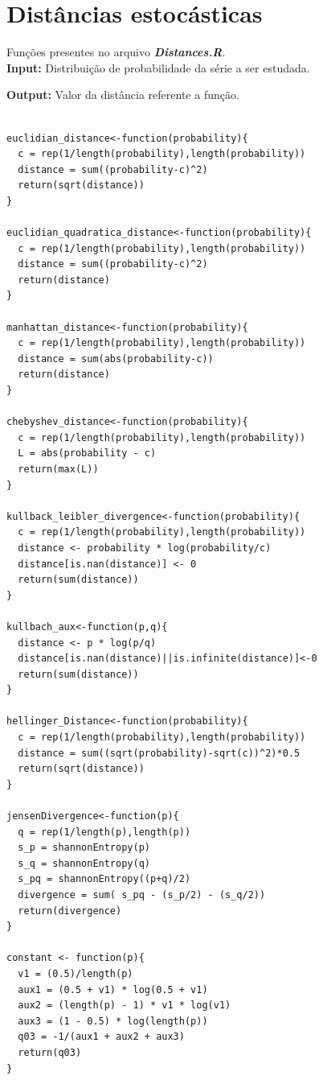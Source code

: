 \documentclass[12pt,letterpaper]{article}
\begin{document}
\section{Distâncias estocásticas}

Funções presentes no arquivo \textbf{\textit{Distances.R}}.\\

\textbf{Input: } Distribuição de probabilidade da série a ser estudada.

\textbf{Output: } Valor da distância referente a função.\\ 

\begin{lstlisting}

euclidian_distance<-function(probability){
  c = rep(1/length(probability),length(probability))
  distance = sum((probability-c)^2)
  return(sqrt(distance))
}

euclidian_quadratica_distance<-function(probability){
  c = rep(1/length(probability),length(probability))
  distance = sum((probability-c)^2)
  return(distance)
}

manhattan_distance<-function(probability){
  c = rep(1/length(probability),length(probability))
  distance = sum(abs(probability-c))
  return(distance)
}

chebyshev_distance<-function(probability){
  c = rep(1/length(probability),length(probability))
  L = abs(probability - c)
  return(max(L))
}

kullback_leibler_divergence<-function(probability){
  c = rep(1/length(probability),length(probability))
  distance <- probability * log(probability/c)
  distance[is.nan(distance)] <- 0
  return(sum(distance))
}

kullbach_aux<-function(p,q){
  distance <- p * log(p/q)
  distance[is.nan(distance)||is.infinite(distance)]<-0
  return(sum(distance))
}

hellinger_Distance<-function(probability){
  c = rep(1/length(probability),length(probability))
  distance = sum((sqrt(probability)-sqrt(c))^2)*0.5
  return(sqrt(distance))
}

jensenDivergence<-function(p){
  q = rep(1/length(p),length(p))
  s_p = shannonEntropy(p)
  s_q = shannonEntropy(q)
  s_pq = shannonEntropy((p+q)/2)
  divergence = sum( s_pq - (s_p/2) - (s_q/2))
  return(divergence)
}

constant <- function(p){
  v1 = (0.5)/length(p)
  aux1 = (0.5 + v1) * log(0.5 + v1)
  aux2 = (length(p) - 1) * v1 * log(v1)
  aux3 = (1 - 0.5) * log(length(p))
  q03 = -1/(aux1 + aux2 + aux3)
  return(q03)
}


\end{lstlisting}
\end{document}
